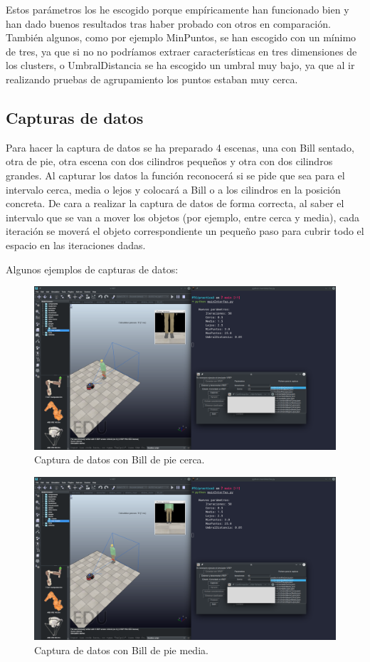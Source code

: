 \documentclass[12pt, spanish]{article}
\begin{document}
Estos parámetros los he escogido porque empíricamente han funcionado bien y han dado buenos resultados tras haber probado con otros en comparación. También algunos, como por ejemplo MinPuntos, se han escogido con un mínimo de tres, ya que si no no podríamos extraer características en tres dimensiones de los clusters, o UmbralDistancia se ha escogido un umbral muy bajo, ya que al ir realizando pruebas de agrupamiento los puntos estaban muy cerca.

\subsection{Capturas de datos}

Para hacer la captura de datos se ha preparado 4 escenas, una con Bill sentado, otra de pie, otra escena con dos cilindros pequeños y otra con dos cilindros grandes. Al capturar los datos la función reconocerá si se pide que sea para el intervalo cerca, media o lejos y colocará a Bill o a los cilindros en la posición concreta. De cara a realizar la captura de datos de forma correcta, al saber el intervalo que se van a mover los objetos (por ejemplo, entre cerca y media), cada iteración se moverá el objeto correspondiente un pequeño paso para cubrir todo el espacio en las iteraciones dadas. 

Algunos ejemplos de capturas de datos:

\begin{figure}[H]
    \centering
    \includegraphics[width=\textwidth]{captura_datos.png}
    \caption{Captura de datos con Bill de pie cerca.}
\end{figure}

\begin{figure}[H]
    \centering
    \includegraphics[width=\textwidth]{captura_media.png}
    \caption{Captura de datos con Bill de pie media.}
\end{figure}
\end{document}
